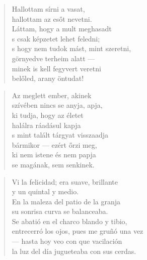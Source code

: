 \newpage

\vspace*{-15mm}
\centeredornament



\begin{verse}
  Hallottam sírni a vasat, \\
  hallottam az esőt nevetni. \\
  Láttam, hogy a mult meghasadt \\
  s csak képzetet lehet feledni; \\
  s hogy nem tudok mást, mint szeretni, \\
  görnyedve terheim alatt --- \\
  minek is kell fegyvert veretni \\
  belőled, arany öntudat!
\end{verse}

\bigskip


\begin{verse}
  Az meglett ember, akinek \\
  szívében nincs se anyja, apja, \\
  ki tudja, hogy az életet \\
  halálra ráadásul kapja \\
  s mint talált tárgyat visszaadja \\
  bármikor --- ezért őrzi meg, \\
  ki nem istene és nem papja \\
  se magának, sem senkinek.
\end{verse}

\newpage

\vspace*{-15mm}
\centeredornament




\begin{verse}
  Vi la felicidad; era suave, brillante \\
  y un quintal y medio. \\
  En la maleza del patio de la granja \\
  su sonrisa curva se balanceaba. \\
  Se abatió en el charco blando y tibio, \\
  entrecerró los ojos, pues me gruñó una vez \\
  --- hasta hoy veo con que vacilación \\
  la luz del día jugueteaba con sus cerdas.
\end{verse}

